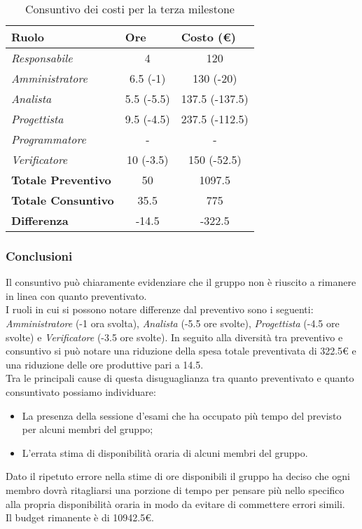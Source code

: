 \begin{table}[H]
    \centering
    \begin{tabular}{|l|c|c|}
    \hline
    \textbf{Ruolo} & \multicolumn{1}{l|}{\textbf{Ore}} & \multicolumn{1}{l|}{\textbf{Costo (€)}} \\ \hline
    \textit{Responsabile}      & 4           & 120            \\ \hline
    \textit{Amministratore}    & 6.5 (-1)    & 130 (-20)      \\ \hline
    \textit{Analista}          & 5.5 (-5.5)   & 137.5 (-137.5)   \\ \hline
    \textit{Progettista}       & 9.5 (-4.5)   & 237.5 (-112.5)   \\ \hline
    \textit{Programmatore}     & -           & -              \\ \hline
    \textit{Verificatore}      & 10 (-3.5) & 150 (-52.5)  \\ \hline
    \textbf{Totale Preventivo} & 50          & 1097.5         \\ \hline
    \textbf{Totale Consuntivo} & 35.5        & 775            \\ \hline
    \textbf{Differenza}        & -14.5       & -322.5         \\ \hline
    \end{tabular}
    \caption{Consuntivo dei costi per la terza milestone}
\end{table}

\subsubsection{Conclusioni}
Il consuntivo può chiaramente evidenziare che il gruppo non è riuscito a rimanere in linea con quanto preventivato.
\\I ruoli in cui si possono notare differenze dal preventivo sono i seguenti: \textit{Amministratore} (-1 ora svolta), \textit{Analista} (-5.5 ore svolte), \textit{Progettista} (-4.5 ore svolte) e \textit{Verificatore} (-3.5 ore svolte).
In seguito alla diversità tra preventivo e consuntivo si può notare una riduzione della spesa totale preventivata di 322.5€ e una riduzione delle ore produttive pari a 14.5.
\\Tra le principali cause di questa disuguaglianza tra quanto preventivato e quanto consuntivato possiamo individuare:
    \begin{itemize}
        \item La presenza della sessione d'esami che ha occupato più tempo del previsto per alcuni membri del gruppo;
        \item L'errata stima di disponibilità oraria di alcuni membri del gruppo.
    \end{itemize}
Dato il ripetuto errore nella stime di ore disponibili il gruppo ha deciso che ogni membro dovrà ritagliarsi una porzione di tempo per pensare più nello specifico alla propria disponibilità oraria in modo da evitare di commettere errori simili.
\\Il budget rimanente è di \num{10942.5}€.




